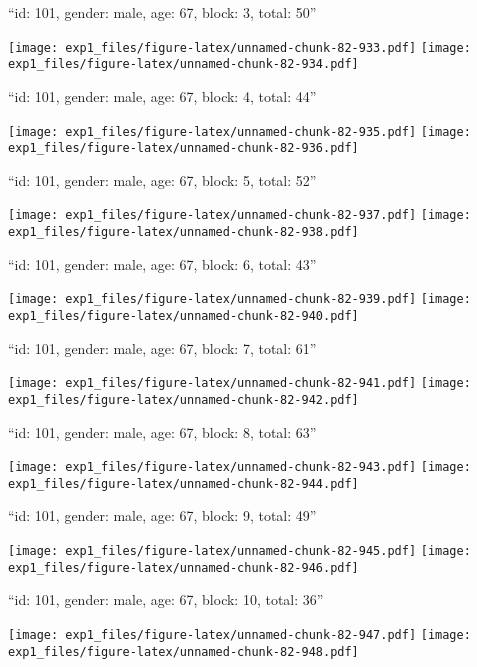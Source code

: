 \documentclass[11pt,,]{article}
\begin{document}
\newpage
[1] 

``id: 101, gender: male, age: 67, block: 3, total: 50''

\texttt{[image: exp1\_files/figure-latex/unnamed-chunk-82-933.pdf]}
\texttt{[image: exp1\_files/figure-latex/unnamed-chunk-82-934.pdf]}

\newpage
[1] 

``id: 101, gender: male, age: 67, block: 4, total: 44''

\texttt{[image: exp1\_files/figure-latex/unnamed-chunk-82-935.pdf]}
\texttt{[image: exp1\_files/figure-latex/unnamed-chunk-82-936.pdf]}

\newpage
[1] 

``id: 101, gender: male, age: 67, block: 5, total: 52''

\texttt{[image: exp1\_files/figure-latex/unnamed-chunk-82-937.pdf]}
\texttt{[image: exp1\_files/figure-latex/unnamed-chunk-82-938.pdf]}

\newpage
[1] 

``id: 101, gender: male, age: 67, block: 6, total: 43''

\texttt{[image: exp1\_files/figure-latex/unnamed-chunk-82-939.pdf]}
\texttt{[image: exp1\_files/figure-latex/unnamed-chunk-82-940.pdf]}

\newpage
[1] 

``id: 101, gender: male, age: 67, block: 7, total: 61''

\texttt{[image: exp1\_files/figure-latex/unnamed-chunk-82-941.pdf]}
\texttt{[image: exp1\_files/figure-latex/unnamed-chunk-82-942.pdf]}

\newpage
[1] 

``id: 101, gender: male, age: 67, block: 8, total: 63''

\texttt{[image: exp1\_files/figure-latex/unnamed-chunk-82-943.pdf]}
\texttt{[image: exp1\_files/figure-latex/unnamed-chunk-82-944.pdf]}

\newpage
[1] 

``id: 101, gender: male, age: 67, block: 9, total: 49''

\texttt{[image: exp1\_files/figure-latex/unnamed-chunk-82-945.pdf]}
\texttt{[image: exp1\_files/figure-latex/unnamed-chunk-82-946.pdf]}

\newpage
[1] 

``id: 101, gender: male, age: 67, block: 10, total: 36''

\texttt{[image: exp1\_files/figure-latex/unnamed-chunk-82-947.pdf]}
\texttt{[image: exp1\_files/figure-latex/unnamed-chunk-82-948.pdf]}
\end{document}
